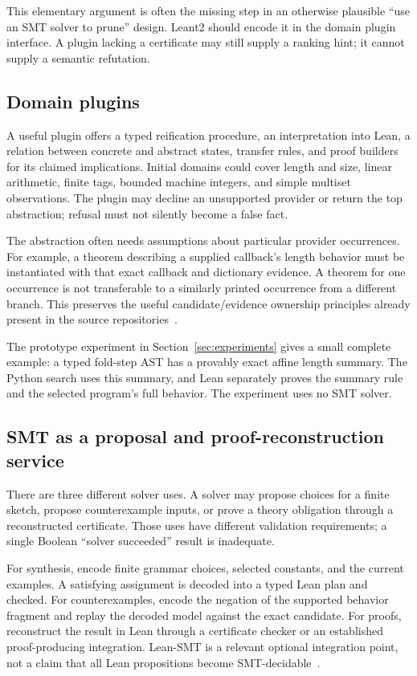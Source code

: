 This elementary argument is often the missing step in an otherwise plausible
``use an SMT solver to prune'' design. Leant2 should encode it in the domain
plugin interface. A plugin lacking a certificate may still supply a ranking
hint; it cannot supply a semantic refutation.

\subsection{Domain plugins}

A useful plugin offers a typed reification procedure, an interpretation into
Lean, a relation between concrete and abstract states, transfer rules, and
proof builders for its claimed implications. Initial domains could cover
length and size, linear arithmetic, finite tags, bounded machine integers, and
simple multiset observations. The plugin may decline an unsupported provider
or return the top abstraction; refusal must not silently become a false fact.

The abstraction often needs assumptions about particular provider occurrences.
For example, a theorem describing a supplied callback's length behavior must
be instantiated with that exact callback and dictionary evidence. A theorem
for one occurrence is not transferable to a similarly printed occurrence from
a different branch. This preserves the useful candidate/evidence ownership
principles already present in the source repositories~\cite{leant-internals}.

The prototype experiment in Section~\ref{sec:experiments} gives a small complete
example: a typed fold-step AST has a provably exact affine length summary. The
Python search uses this summary, and Lean separately proves the summary rule
and the selected program's full behavior. The experiment uses no SMT solver.

\subsection{SMT as a proposal and proof-reconstruction service}

There are three different solver uses. A solver may propose choices for a
finite sketch, propose counterexample inputs, or prove a theory obligation
through a reconstructed certificate. Those uses have different validation
requirements; a single Boolean ``solver succeeded'' result is inadequate.

For synthesis, encode finite grammar choices, selected constants, and the
current examples. A satisfying assignment is decoded into a typed Lean plan
and checked. For counterexamples, encode the negation of the supported behavior
fragment and replay the decoded model against the exact candidate. For proofs,
reconstruct the result in Lean through a certificate checker or an established
proof-producing integration. Lean-SMT is a relevant optional integration point,
not a claim that all Lean propositions become SMT-decidable~\cite{lean-smt}.

